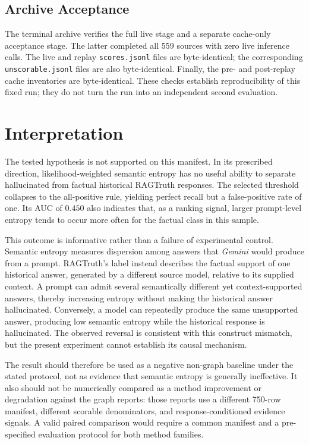 \documentclass[11pt,a4paper]{article}
\begin{document}
\subsection{Archive Acceptance}

The terminal archive verifies the full live stage and a separate cache-only acceptance stage.  The latter completed all 559 sources with zero live inference calls.  The live and replay \texttt{scores.jsonl} files are byte-identical; the corresponding \texttt{unscorable.jsonl} files are also byte-identical.  Finally, the pre- and post-replay cache inventories are byte-identical.  These checks establish reproducibility of this fixed run; they do not turn the run into an independent second evaluation.

\section{Interpretation}

The tested hypothesis is not supported on this manifest.  In its prescribed direction, likelihood-weighted semantic entropy has no useful ability to separate hallucinated from factual historical RAGTruth responses.  The selected threshold collapses to the all-positive rule, yielding perfect recall but a false-positive rate of one.  Its AUC of $0.450$ also indicates that, as a ranking signal, larger prompt-level entropy tends to occur more often for the factual class in this sample.

This outcome is informative rather than a failure of experimental control.  Semantic entropy measures dispersion among answers that \emph{Gemini} would produce from a prompt.  RAGTruth's label instead describes the factual support of one historical answer, generated by a different source model, relative to its supplied context.  A prompt can admit several semantically different yet context-supported answers, thereby increasing entropy without making the historical answer hallucinated.  Conversely, a model can repeatedly produce the same unsupported answer, producing low semantic entropy while the historical response is hallucinated.  The observed reversal is consistent with this construct mismatch, but the present experiment cannot establish its causal mechanism.

The result should therefore be used as a negative non-graph baseline under the stated protocol, not as evidence that semantic entropy is generally ineffective.  It also should not be numerically compared as a method improvement or degradation against the graph reports: those reports use a different 750-row manifest, different scorable denominators, and response-conditioned evidence signals.  A valid paired comparison would require a common manifest and a pre-specified evaluation protocol for both method families.
\end{document}
